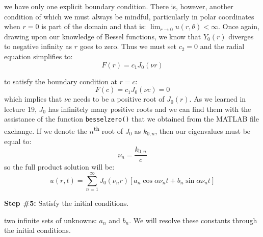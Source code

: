  we have only one explicit boundary condition. There is, however, another condition of which we must always be mindful, particularly in polar coordinates when $r=0$ is part of the domain and that is: $\lim_{r \to 0} u(r,\theta) < \infty$.  Once again, drawing upon our knowledge of Bessel functions, we know that $Y_0(r)$ diverges to negative infinity as $r$ goes to zero.  Thus we must set $c_2 = 0$ and the radial equation simplifies to:
\begin{equation*}
F(r) = c_1J_0(\nu r)
\end{equation*} 

 to satisfy the boundary condition at $r=c$:
\begin{equation*}
F(c) = c_1J_0(\nu c) = 0
\end{equation*}
which implies that $\nu c$ needs to be a positive root of $J_0(r)$.  As we learned in lecture 19, $J_0$ has infinitely many positive roots and we can find them with the assistance of the function \lstinline[style=myMatlab]{besselzero()} that we obtained from the MATLAB file exchange.  If we denote the $n$\textsuperscript{th} root of $J_0$ as $k_{0,n}$, then our eigenvalues must be equal to:
\begin{equation*}
\nu_n = \frac{k_{0,n}}{c}
\end{equation*}
so the full product solution will be:
\begin{equation*}
u(r,t) = \sum\limits_{n=1}^{\infty} J_0(\nu_n r)\left[a_n \cos{\alpha \nu_n t} + b_n \sin{\alpha \nu_n t} \right]
\end{equation*}

\vspace{0.25cm}

\noindent\textbf{Step \#5:} Satisfy the initial conditions.

\vspace{0.25cm}

 two infinite sets of unknowns: $a_n$ and $b_n$.  We will resolve these constants through the initial conditions.

